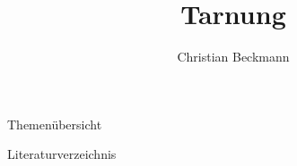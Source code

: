 \documentclass[aspectratio=169, 9pt, bibliography=totoc]{beamer}
\title{Tarnung}
\author[C.~Beckmann]{Christian Beckmann}
\institute[Seminar Moderne Optik]{Seminar Moderne Optik}
\begin{document}
\maketitle

\begin{frame}{Themen\"ubersicht}
  \tableofcontents
\end{frame}



\begin{frame}{Literaturverzeichnis}
	\printbibliography
\end{frame}
\end{document}
